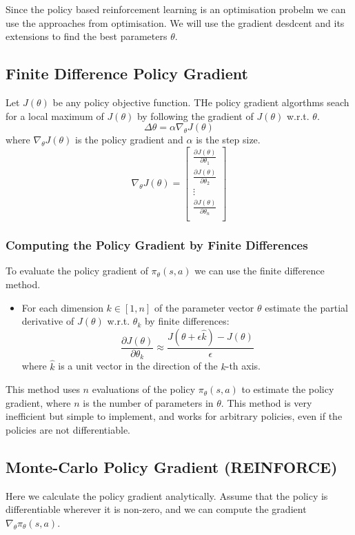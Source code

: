 Since the policy based reinforcement learning is an optimisation probelm we can use
the approaches from optimisation. We will use the gradient desdcent and its extensions 
to find the best parameters \(\theta\).

\subsection{Finite Difference Policy Gradient}
Let \(J(\theta)\) be any policy objective function. THe policy gradient algorthms seach for a local
maximum of \(J(\theta)\) by following the gradient of \(J(\theta)\) w.r.t. \(\theta\).
\[
    \Delta \theta = \alpha \nabla_\theta J(\theta)
\] 
where \(\nabla _\theta J(\theta)\) is the policy gradient and \(\alpha\) is the step size.
\[
    \nabla_\theta J(\theta) = \begin{bmatrix}
        \frac{\partial J(\theta)}{\partial \theta_1} \\
        \frac{\partial J(\theta)}{\partial \theta_2} \\
        \vdots \\
        \frac{\partial J(\theta)}{\partial \theta_n} \\
    \end{bmatrix}
\] 

\subsubsection{Computing the Policy Gradient by Finite Differences}
To evaluate the policy gradient of \(\pi _\theta (s,a) \) we can use the finite difference method.
\begin{itemize}
    \item For each dimension \(k \in [1,n]\) of the parameter vector \( \theta \) estimate
    the partial derivative of \(J(\theta)\) w.r.t. \(\theta_k\) by finite differences:
    \[
        \frac{\partial J(\theta)}{\partial \theta_k} \approx \frac{J(\theta + \epsilon \hat{k}) - J(\theta)}{\epsilon}
    \]
    where \(\hat{k}\) is a unit vector in the direction of the \(k\)-th axis.
\end{itemize}
This method uses \(n\) evaluations of the policy \( \pi _\theta (s,a) \) to estimate the policy gradient,
where \(n\) is the number of parameters in \(\theta\). This method is very inefficient but simple to implement,
and works for arbitrary policies, even if the policies are not differentiable.

\subsection{Monte-Carlo Policy Gradient (REINFORCE)}
Here we calculate the policy gradient analytically. Assume that the policy is differentiable
wherever it is non-zero, and we can compute the gradient \( \nabla_\theta \pi_\theta(s,a) \).

